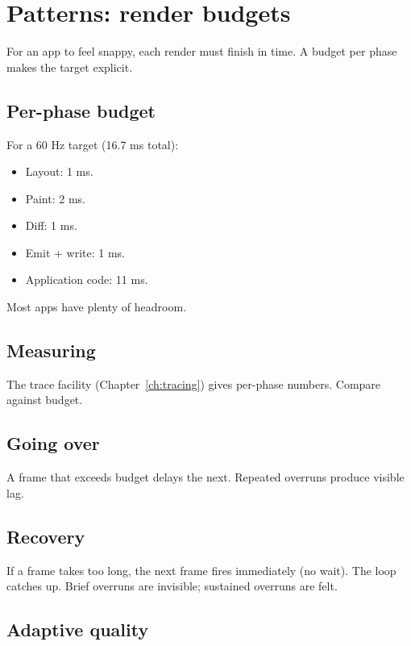 \chapter{Patterns: render budgets}
\label{ch:renderbudget}

\begin{aside}
For an app to feel snappy, each render must finish in time.
A budget per phase makes the target explicit.
\end{aside}

\section{Per-phase budget}

For a 60 Hz target (16.7 ms total):

\begin{itemize}[leftmargin=*]
  \item Layout: 1 ms.
  \item Paint: 2 ms.
  \item Diff: 1 ms.
  \item Emit + write: 1 ms.
  \item Application code: 11 ms.
\end{itemize}

Most apps have plenty of headroom.

\section{Measuring}

The trace facility (Chapter~\ref{ch:tracing}) gives per-phase
numbers. Compare against budget.

\section{Going over}

A frame that exceeds budget delays the next. Repeated
overruns produce visible lag.

\section{Recovery}

If a frame takes too long, the next frame fires
immediately (no wait). The loop catches up. Brief
overruns are invisible; sustained overruns are felt.

\section{Adaptive quality}

